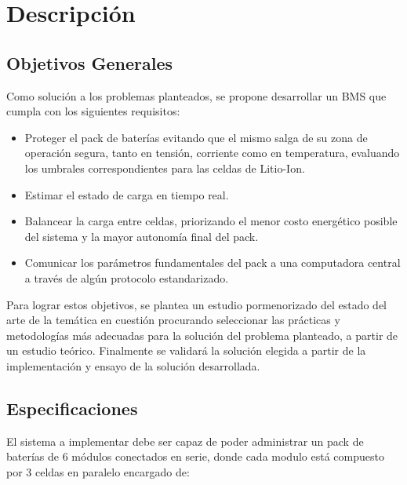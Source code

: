 \documentclass[10pt,a4paper]{article}
\begin{document}
\section{Descripci\'on}\label{descripcion}

\subsection{Objetivos Generales}

Como solución a los problemas planteados, se propone desarrollar un 
\acrshort{BMS} que cumpla con los siguientes requisitos:

\begin{itemize}
    \item Proteger el pack de baterías evitando que el mismo salga de su 
	zona de operación segura, tanto en tensión, corriente como en 
	temperatura, evaluando los umbrales correspondientes para las celdas de 
    Litio-Ion.
    \item Estimar el estado de carga en tiempo real.
    \item Balancear la carga entre celdas, priorizando el menor costo 
	energético posible del sistema y la mayor autonomía final del pack.
    \item Comunicar los parámetros fundamentales del pack a una computadora 
	central a través de algún protocolo estandarizado.
\end{itemize}

\noindent Para lograr estos objetivos, se plantea un estudio pormenorizado 
del estado del arte de la temática en cuestión procurando seleccionar las 
prácticas y metodologías más adecuadas para la solución del problema 
planteado, a partir de un estudio teórico. Finalmente se validará la 
solución elegida a partir de la implementación y ensayo de la solución 
desarrollada.

\subsection{Especificaciones}\label{proy_specs}

\noindent El sistema a implementar debe ser capaz de poder administrar un 
pack de bater\'ias de 6 m\'odulos conectados en serie, donde cada modulo est\'a 
compuesto por 3 celdas en paralelo encargado de: 
\end{document}
